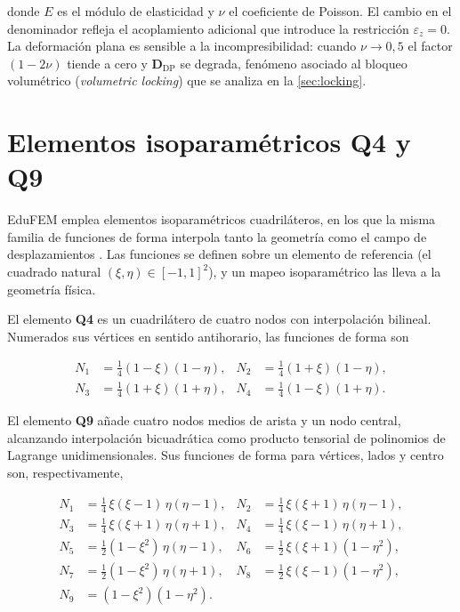 donde $E$ es el módulo de elasticidad y $\nu$ el coeficiente de Poisson. El cambio en el denominador refleja el acoplamiento adicional que introduce la restricción $\varepsilon_z = 0$. La deformación plana es sensible a la incompresibilidad: cuando $\nu \to 0{,}5$ el factor $(1-2\nu)$ tiende a cero y $\bm{D}_{\text{DP}}$ se degrada, fenómeno asociado al bloqueo volumétrico (\emph{volumetric locking}) que se analiza en la \autoref{sec:locking}.

\section{Elementos isoparamétricos Q4 y Q9}
\label{sec:isoparametricos}

EduFEM emplea elementos isoparamétricos cuadriláteros, en los que la misma familia de funciones de forma interpola tanto la geometría como el campo de desplazamientos \autocites[p.~339]{bathe2014fem}[p.~187]{onate2009structural}. Las funciones se definen sobre un elemento de referencia (el cuadrado natural $(\xi, \eta) \in [-1, 1]^2$), y un mapeo isoparamétrico las lleva a la geometría física.

El elemento \textbf{Q4} es un cuadrilátero de cuatro nodos con interpolación bilineal. Numerados sus vértices en sentido antihorario, las funciones de forma son

\begin{equation}
\begin{aligned}
N_1 &= \tfrac{1}{4}(1-\xi)(1-\eta), & N_2 &= \tfrac{1}{4}(1+\xi)(1-\eta), \\
N_3 &= \tfrac{1}{4}(1+\xi)(1+\eta), & N_4 &= \tfrac{1}{4}(1-\xi)(1+\eta).
\end{aligned}
\label{eq:N-q4}
\end{equation}

El elemento \textbf{Q9} añade cuatro nodos medios de arista y un nodo central, alcanzando interpolación bicuadrática como producto tensorial de polinomios de Lagrange unidimensionales. Sus funciones de forma para vértices, lados y centro son, respectivamente,

\begin{equation}
\begin{aligned}
N_1 &= \tfrac{1}{4}\,\xi(\xi-1)\,\eta(\eta-1), & N_2 &= \tfrac{1}{4}\,\xi(\xi+1)\,\eta(\eta-1), \\
N_3 &= \tfrac{1}{4}\,\xi(\xi+1)\,\eta(\eta+1), & N_4 &= \tfrac{1}{4}\,\xi(\xi-1)\,\eta(\eta+1), \\
N_5 &= \tfrac{1}{2}(1-\xi^2)\,\eta(\eta-1), & N_6 &= \tfrac{1}{2}\,\xi(\xi+1)(1-\eta^2), \\
N_7 &= \tfrac{1}{2}(1-\xi^2)\,\eta(\eta+1), & N_8 &= \tfrac{1}{2}\,\xi(\xi-1)(1-\eta^2), \\
N_9 &= (1-\xi^2)(1-\eta^2). &&
\end{aligned}
\label{eq:N-q9}
\end{equation}

